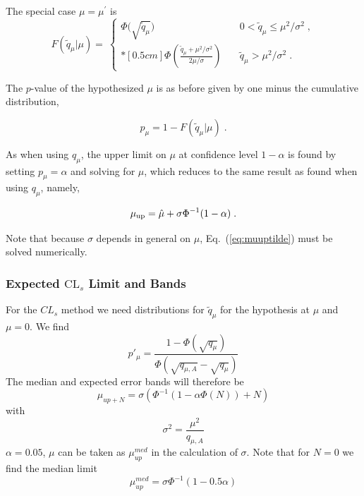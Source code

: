 \documentclass{cernrep}
\begin{document}
 The special case $\mu = \mu^{\prime}$ is
\begin{equation}
\label{eq:tildeqmmcdf} 
F(\tilde{q}_{\mu}|\mu) = 
 \: \left\{ \! \! \begin{array}{lll}
\Phi\Big( \sqrt{\tilde{q}_{\mu}} \Big)
                 & \quad 0 < \tilde{q}_{\mu} \le \mu^2/\sigma^2  
\;, \\*[0.5 cm]
\Phi \left( \frac{ \tilde{q}_{\mu} + \mu^2/\sigma^2}
{2\mu/\sigma} \right)
                 &  \quad \tilde{q}_{\mu} > \mu^2/\sigma^2 \;.
              \end{array}
       \right.
\end{equation}

 The $p$-value of the hypothesized $\mu$ is as before
given by one minus the cumulative distribution,

\begin{equation}
\label{eq:pvalmutilde}
p_{\mu} = 1 - F(\tilde{q}_{\mu} | \mu) \;.
\end{equation}

As when using $q_{\mu}$, the upper limit on $\mu$ at confidence level
$1 - \alpha$ is found by setting $p_{\mu} = \alpha$ and solving for
$\mu$, which reduces to the same result as found when using $q_{\mu}$,
namely,

\begin{equation}
\label{eq:muuptilde}
\mu_{\rm up} =  \hat{\mu} + \sigma \Phi^{-1}(1 - \alpha) \;.
\end{equation}

 Note that because $\sigma$ depends in general on $\mu$,
Eq.~(\ref{eq:muuptilde}) must be solved numerically.  



 \subsubsection{Expected $\mathrm{CL}_s$ Limit and Bands}
For the $CL_s$ method we need distributions for $\tilde{q}_\mu$ for the hypothesis at $\mu$ and $\mu=0$.   We find
 \begin{equation}
 p'_{\mu}=\frac{1-\Phi(\sqrt{q_\mu})}{\Phi(\sqrt{q_{\mu,A}}-\sqrt{q_{\mu}})}
 \end{equation}
The median and expected error bands will therefore be
   \begin{equation}
   \mu_{{up}+N}=\sigma(\Phi^{-1}(1-\alpha \Phi(N))+N)
   \end{equation}   
\noindent    with 
   \begin{equation}
   \sigma^2=\frac{\mu^2}{q_{\mu,A}}
      \end{equation}      
  \noindent     $\alpha=0.05$, $\mu$ can be taken as $\mu_{up}^{med}$ in the calculation of $\sigma$.
        Note that for $N=0$ we find the median limit    
        \begin{equation}
   \mu_{up}^{med}=\sigma \Phi^{-1}(1-0.5\alpha)
      \end{equation}
\end{document}

